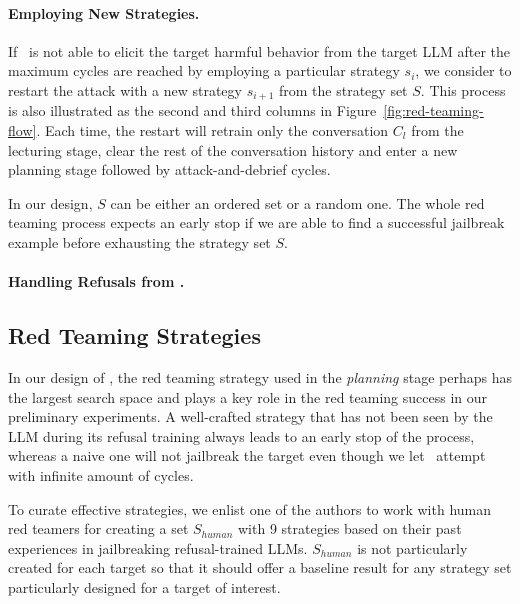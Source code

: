 \paragraph{Employing New Strategies.} If \methodname~is not able to elicit the target harmful behavior from the target LLM after the maximum cycles are reached by employing a particular strategy $s_i$, we consider to restart the attack with a new strategy $s_{i+1}$ from the strategy set $S$. This process is also illustrated as the second and third columns in Figure~\ref{fig:red-teaming-flow}. Each time, the restart will retrain only the conversation $C_l$ from the lecturing stage, clear the rest of the conversation history and enter a new planning stage followed by attack-and-debrief cycles. 

In our design, $S$ can be either an ordered set or a random one. The whole red teaming process expects an early stop if we are able to find a successful jailbreak example before exhausting the strategy set $S$. 

\paragraph{Handling Refusals from \methodname.}


\subsection{Red Teaming Strategies}\label{sec:method:strategy-optimization}

In our design of \methodname, the red teaming strategy used in the \emph{planning} stage perhaps has the largest search space and plays a key role in the red teaming success in our preliminary experiments. A well-crafted strategy that has not been seen by the LLM during its refusal training always leads to an early stop of the process, whereas a naive one will not jailbreak the target even though we let \methodname~attempt with infinite amount of cycles. 

To curate effective strategies, we enlist one of the authors to work with human red teamers for creating a set $S_{human}$ with 9 strategies based on their past experiences in jailbreaking refusal-trained LLMs. $S_{human}$ is not particularly created for each target so that it should offer a baseline result for any strategy set particularly designed for a target of interest. 

